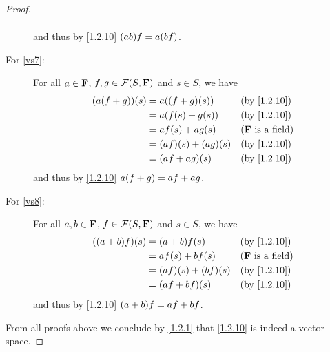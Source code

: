 \begin{proof}
\begin{description}
\begin{align*}
            \end{align*}
            and thus by \cref{1.2.10} \(\p{ab} f = a \p{bf}\).
        \item[For \ref{vs7}:]
            For all \(a \in \mathbf{F}\), \(f, g \in \mathcal{F}\p{S, \F}\) and \(s \in S\), we have
            \begin{align*}
                \p{a \p{f + g}}\p{s} & = a \p{\p{f + g}\p{s}}      &  & \text{(by \cref{1.2.10})}  \\
                                     & = a \p{f\p{s} + g\p{s}}     &  & \text{(by \cref{1.2.10})}  \\
                                     & = af\p{s} + ag\p{s}         &  & \text{(\(\F\) is a field)} \\
                                     & = \p{af}\p{s} + \p{ag}\p{s} &  & \text{(by \cref{1.2.10})}  \\
                                     & = \p{af + ag}\p{s}          &  & \text{(by \cref{1.2.10})}
            \end{align*}
            and thus by \cref{1.2.10} \(a \p{f + g} = af + ag\).
        \item[For \ref{vs8}:]
            For all \(a, b \in \mathbf{F}\), \(f \in \mathcal{F}\p{S, \F}\) and \(s \in S\), we have
            \begin{align*}
                \p{\p{a + b} f}\p{s} & = \p{a + b} f\p{s}          &  & \text{(by \cref{1.2.10})}  \\
                                     & = af\p{s} + bf\p{s}         &  & \text{(\(\F\) is a field)} \\
                                     & = \p{af}\p{s} + \p{bf}\p{s} &  & \text{(by \cref{1.2.10})}  \\
                                     & = \p{af + bf}\p{s}          &  & \text{(by \cref{1.2.10})}
            \end{align*}
            and thus by \cref{1.2.10} \(\p{a + b} f = af + bf\).
    \end{description}
    From all proofs above we conclude by \cref{1.2.1} that \cref{1.2.10} is indeed a vector space.
\end{proof}
